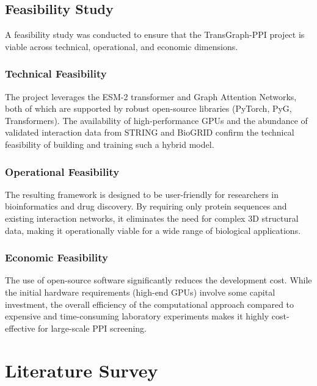 \documentclass[12pt,a4paper]{report}
\begin{document}
\section{Feasibility Study}
A feasibility study was conducted to ensure that the TransGraph-PPI project is viable across technical, operational, and economic dimensions.

\subsection{Technical Feasibility}
The project leverages the ESM-2 transformer and Graph Attention Networks, both of which are supported by robust open-source libraries (PyTorch, PyG, Transformers). The availability of high-performance GPUs and the abundance of validated interaction data from STRING and BioGRID confirm the technical feasibility of building and training such a hybrid model.

\subsection{Operational Feasibility}
The resulting framework is designed to be user-friendly for researchers in bioinformatics and drug discovery. By requiring only protein sequences and existing interaction networks, it eliminates the need for complex 3D structural data, making it operationally viable for a wide range of biological applications.

\subsection{Economic Feasibility}
The use of open-source software significantly reduces the development cost. While the initial hardware requirements (high-end GPUs) involve some capital investment, the overall efficiency of the computational approach compared to expensive and time-consuming laboratory experiments makes it highly cost-effective for large-scale PPI screening.

\chapter{Literature Survey}
\end{document}
